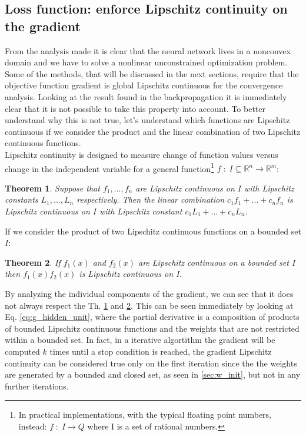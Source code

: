 \documentclass[11pt]{article}
\newtheorem{theorem}{Theorem}[section]
\begin{document}
\subsection{Loss function: enforce Lipschitz continuity on the gradient}
\label{sec:l_lips_g}
From the analysis made it is clear that the neural network lives in a nonconvex domain and we have to solve a nonlinear unconstrained optimization problem. Some of the methods, that will be discussed in the next sections, require that the objective function gradient is global Lipschitz continuous for the convergence analysis. Looking at the result found in the backpropagation it is immediately clear that it is not possible to take this property into account. 
To better understand why this is not true, let's understand which functions are Lipschitz continuous if we consider the product and the linear combination of two Lipschitz continuous functions.\\

Lipschitz continuity is designed to measure change of function values versus change in the independent variable for a general function\footnote{In practical implementations, with the typical floating point numbers, instead: $f \;:\; I \rightarrow Q$ where I is a set of rational numbers.} $f \;:\; I \subseteq \mathbb{R}^n \rightarrow \mathbb{R}^m$:
\begin{theorem}
\label{th:l_sum}
Suppose that $f_1,..., f_n$ are Lipschitz continuous on $I$ with Lipschitz constants  $L_1 , ... , L_n$ respectively. Then the linear combination $c_1f_1 +...+c_nf_n$ is Lipschitz continuous on $I$ with Lipschitz constant $c_1L_1 +...+ c_nL_n$.
\end{theorem}
\noindent If we consider the product of two Lipschitz continuous functions on a bounded set $I$:
\begin{theorem}
\label{th:l_prodoct}
If $f_1(x)$ and $f_2(x)$ are Lipschitz continuous on a bounded set $I$ then $f_1(x)f_2(x)$ is Lipschitz continuous on I.
\end{theorem}
\noindent By analyzing the individual components of the gradient, we can see that it does not always respect the Th. \ref{th:l_sum} and \ref{th:l_prodoct}. This can be seen immediately by looking at Eq. \ref{eq:g_hidden_unit}, where the partial derivative is a composition of products of bounded Lipschitz continuous functions and the weights that are not restricted within a bounded set. In fact, in a iterative algortithm the gradient will be computed $k$ times until a stop condition is reached, the gradient Lipschitz continuity can be considered true only on the first iteration since the the weights are generated by a bounded and closed set, as seen in \ref{sec:w_init}, but not in any further iterations.\\
\end{document}
